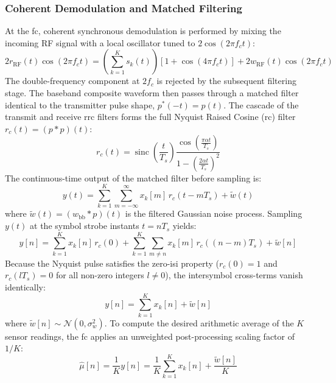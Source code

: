 \documentclass[Markos_Delaportas_1316.tex]{subfiles}
\begin{document}
\subsubsection{Coherent Demodulation and Matched Filtering}
\label{subsubsec:coherent_demodulation_matched_filter}
At the \gls{fc}, coherent synchronous demodulation is performed by
mixing the incoming RF signal with a local oscillator
tuned to $2\cos(2\pi f_c t)$:
\begin{equation}
    2 r_{\text{RF}}(t) \cos(2\pi f_c t) = \left( \sum_{k=1}^K s_k(t)
    \right) \left[ 1 + \cos(4\pi f_c t) \right] + 2 w_{\text{RF}}(t)
    \cos(2\pi f_c t)
    \label{eq:coherent_mixing}
\end{equation}
The double-frequency component at $2f_c$ is rejected by the
subsequent filtering stage. The baseband composite waveform
then passes through a matched filter identical to the transmitter
pulse shape, $p^*(-t) = p(t)$. The cascade of the transmit
and receive \gls{rrc} filters forms the full Nyquist Raised Cosine
(\gls{rc}) filter $r_c(t) = (p * p)(t)$:
\begin{equation}
    r_c(t) = \operatorname{sinc}\left(\frac{t}{T_s}\right)
    \frac{\cos\left(\frac{\pi \alpha t}{T_s}\right)}{1 -
    \left(\frac{2\alpha t}{T_s}\right)^2}
    \label{eq:nyquist_rc_pulse}
\end{equation}
The continuous-time output of the matched filter before sampling is:
\begin{equation}
    y(t) = \sum_{k=1}^K \sum_{m=-\infty}^{\infty} x_k[m] \, r_c(t - m
    T_s) + \tilde{w}(t)
    \label{eq:matched_filter_output_continuous}
\end{equation}
where $\tilde{w}(t) = (w_{\text{bb}} * p)(t)$ is the filtered
Gaussian noise process. Sampling $y(t)$ at the symbol strobe
instants $t = n T_s$ yields:
\begin{equation}
    y[n] = \sum_{k=1}^K x_k[n] \, r_c(0) + \sum_{k=1}^K \sum_{m \neq
    n} x_k[m] \, r_c((n-m)T_s) + \tilde{w}[n]
    \label{eq:sampled_matched_output}
\end{equation}
Because the Nyquist pulse satisfies the zero-\gls{isi} property
($r_c(0) = 1$ and $r_c(l T_s) = 0$ for all non-zero integers $l \neq 0$),
the intersymbol cross-terms vanish identically:
\begin{equation}
    y[n] = \sum_{k=1}^K x_k[n] + \tilde{w}[n]
    \label{eq:mac_sum}
\end{equation}
where $\tilde{w}[n] \sim \mathcal{N}(0, \sigma_w^2)$. To compute the
desired arithmetic average of the $K$ sensor readings,
the \gls{fc} applies an unweighted post-processing scaling factor of $1/K$:
\begin{equation}
    \hat{\mu}[n] = \frac{1}{K} y[n] = \frac{1}{K} \sum_{k=1}^K x_k[n]
    + \frac{\tilde{w}[n]}{K}
    \label{eq:fc_estimated_average}
\end{equation}
\end{document}

